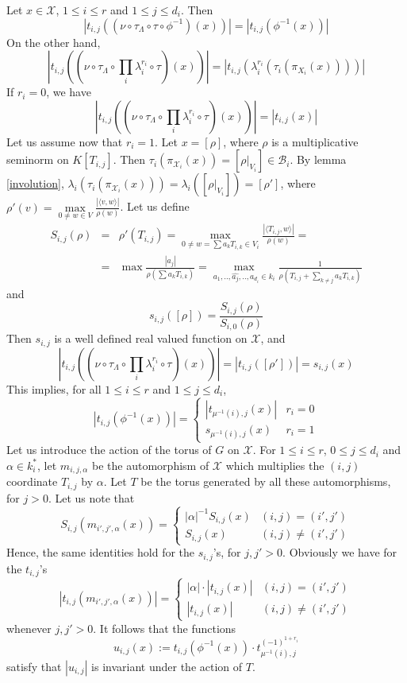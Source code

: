 \documentclass{amsart}
\theoremstyle{theorem}
\theoremstyle{lemma}
\theoremstyle{prop}
\theoremstyle{definition}
\theoremstyle{corollary}
\theoremstyle{remark}
\newcommand{\B}{\mathcal{B}}
\newcommand{\X}{\mathcal{X}}
\begin{document}
Let $x\in \X$, $1\leq i \leq r$ and $1 \leq j \leq d_i$. Then
$$ |t_{i,j}((\nu \circ \tau_\Lambda \circ \tau \circ \phi^{-1})(x))| = |t_{i,j}(\phi^{-1}(x))|$$
On the other hand,
$$ |t_{i,j}((\nu \circ \tau_\Lambda \circ \prod\limits_i \lambda_i ^ {r_i} \circ \tau)(x))|=|t_{i,j}(\lambda_i^{r_i}(\tau_i(\pi_{X_i}(x))))|$$
If $r_i=0$, we have $$ |t_{i,j}((\nu \circ \tau_\Lambda \circ \prod\limits_i \lambda_i ^ {r_i} \circ \tau)(x))|=|t_{i,j}(x)|$$
Let us assume now that $r_i=1$. Let $x=[\rho]$, where $\rho$ is a multiplicative seminorm on $K[T_{i,j}]$. Then $\tau_i(\pi_{\X_i}(x))=[\rho|_{V_i}]\in \B_i$. By lemma \ref{involution}, 
$\lambda_i(\tau_i(\pi_{\X_i}(x)))=\lambda_i([\rho|_{V_i}])=[\rho']$, where $\rho'(v)=\max\limits_{0\neq w \in V} \frac {|\langle v,w\rangle|}{\rho(w)}$. Let us define 
\begin{eqnarray*} S_{i,j}(\rho) &=& \rho'(T_{i,j})=\max\limits_{0\neq w=\sum a_k T_{i,k} \in V_i} \frac {|\langle T_{i,j},w\rangle|}{\rho(w)}  =\\
&=& \max \frac{|a_j|}{\rho(\sum a_k T_{i,k})} = \max\limits_{a_1,..,\hat{a_j}, .., a_{d_i} \in k_i} \frac1{\rho(T_{i,j} + \sum\limits_{k \neq j}a_kT_{i,k})}\end{eqnarray*}
and $$s_{i,j}([\rho])=\frac{S_{i,j}(\rho)}{S_{i,0}(\rho)}$$
Then $s_{i,j}$ is a well defined real valued function on $\X$, and$$ |t_{i,j}((\nu \circ \tau_\Lambda \circ \prod\limits_i \lambda_i ^ {r_i} \circ \tau)(x))|=|t_{i,j}([\rho'])|=s_{i,j}(x)$$
This implies, for all $1\leq i \leq r$ and $1\leq j \leq d_i$, 
\[
|t_{i,j}(\phi^{-1}(x))| = \left \{ \begin{array}{cl}
|t_{\mu^{-1}(i),j}(x)| & r_i= 0 \\
s_{\mu^{-1}(i),j}(x) & r_i= 1 \end{array} \right.
\]
Let us introduce the action of the torus of $G$ on $\X$. For $1\leq i \leq r$, $0\leq j\leq d_i$ and $\alpha\in k_i^*$, let $m_{i,j,\alpha}$ be the automorphism of $\X$ which multiplies the $(i,j)$ coordinate $T_{i,j}$ by $\alpha$. Let $T$ be the torus generated by all these automorphisms, for $j>0$. Let us note that
\[
S_{i,j}(m_{i',j',\alpha}(x))= \left \{ \begin{array}{ll}
|\alpha|^{-1}S_{i,j}(x) & (i,j)=(i',j') \\
S_{i,j}(x) & (i,j) \neq (i',j') \end{array} \right.
\]
Hence, the same identities hold for the $s_{i,j}$'s, for $j,j' > 0$.
Obviously we have for the $t_{i,j}$'s
\[
|t_{i,j}(m_{i',j',\alpha}(x))|= \left \{ \begin{array}{ll}
|\alpha|\cdot|t_{i,j}(x)| & (i,j)=(i',j') \\
|t_{i,j}(x)| & (i,j) \neq (i',j') \end{array} \right.
\]
whenever $j,j'>0$. It follows that the functions
$$ u_{i,j}(x) := t_{i,j}(\phi^{-1}(x)) \cdot t_{\mu^{-1}(i),j}^{(-1)^{1+r_i}} $$
satisfy that $|u_{i,j}|$ is invariant under the action of $T$. 
\end{document}
